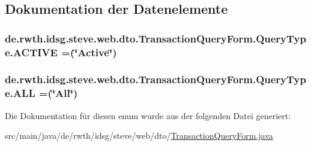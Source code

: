\subsection{Dokumentation der Datenelemente}
\hypertarget{enumde_1_1rwth_1_1idsg_1_1steve_1_1web_1_1dto_1_1_transaction_query_form_1_1_query_type_a6e5259bb3f9eda13b9a7373d957da90a}{
\subsubsection[{A\-C\-T\-I\-V\-E}]{\setlength{\rightskip}{0pt plus 5cm}de.\-rwth.\-idsg.\-steve.\-web.\-dto.\-Transaction\-Query\-Form.\-Query\-Type.\-A\-C\-T\-I\-V\-E =(\char`\"{}Active\char`\"{})}}\label{enumde_1_1rwth_1_1idsg_1_1steve_1_1web_1_1dto_1_1_transaction_query_form_1_1_query_type_a6e5259bb3f9eda13b9a7373d957da90a}
\hypertarget{enumde_1_1rwth_1_1idsg_1_1steve_1_1web_1_1dto_1_1_transaction_query_form_1_1_query_type_a2d65ed09e38c3b1847a09a7b3573d970}{
\subsubsection[{A\-L\-L}]{\setlength{\rightskip}{0pt plus 5cm}de.\-rwth.\-idsg.\-steve.\-web.\-dto.\-Transaction\-Query\-Form.\-Query\-Type.\-A\-L\-L =(\char`\"{}All\char`\"{})}}\label{enumde_1_1rwth_1_1idsg_1_1steve_1_1web_1_1dto_1_1_transaction_query_form_1_1_query_type_a2d65ed09e38c3b1847a09a7b3573d970}


Die Dokumentation für diesen enum wurde aus der folgenden Datei generiert\-:\begin{DoxyCompactItemize}
\item 
src/main/java/de/rwth/idsg/steve/web/dto/\hyperlink{_transaction_query_form_8java}{Transaction\-Query\-Form.\-java}\end{DoxyCompactItemize}
